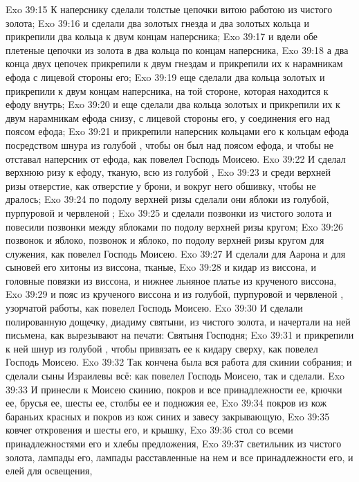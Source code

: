 \vs Exo 39:15 К наперснику сделали толстые цепочки витою работою из чистого золота;
\vs Exo 39:16 и сделали два золотых гнезда и два золотых кольца и прикрепили два кольца к двум концам наперсника;
\vs Exo 39:17 и вдели обе плетеные цепочки из золота в два кольца по концам наперсника,
\vs Exo 39:18 а два конца двух цепочек прикрепили к двум гнездам и прикрепили их к нарамникам ефода с лицевой стороны его;
\vs Exo 39:19 еще сделали два кольца золотых и прикрепили к двум  концам наперсника, на той стороне, которая находится к ефоду внутрь;
\vs Exo 39:20 и еще сделали два кольца золотых и прикрепили их к двум нарамникам ефода снизу, с лицевой стороны его, у соединения его над поясом ефода;
\vs Exo 39:21 и прикрепили наперсник кольцами его к кольцам ефода посредством шнура из голубой , чтобы он был над поясом ефода, и чтобы не отставал наперсник от ефода, как повелел Господь Моисею.
\rsbpar\vs Exo 39:22 И сделал верхнюю ризу к ефоду, тканую, всю из голубой ,
\vs Exo 39:23 и среди верхней ризы отверстие, как отверстие у брони, и вокруг него обшивку, чтобы не дралось;
\vs Exo 39:24 по подолу верхней ризы сделали они яблоки из голубой, пурпуровой и червленой ;
\vs Exo 39:25 и сделали позвонки из чистого золота и повесили позвонки между яблоками по подолу верхней ризы кругом;
\vs Exo 39:26 позвонок и яблоко, позвонок и яблоко, по подолу верхней ризы кругом для служения, как повелел Господь Моисею.
\rsbpar\vs Exo 39:27 И сделали для Аарона и для сыновей его хитоны из виссона, тканые,
\vs Exo 39:28 и кидар из виссона, и головные повязки из виссона, и нижнее льняное платье из крученого виссона,
\vs Exo 39:29 и пояс из крученого виссона и из голубой, пурпуровой и червленой , узорчатой работы, как повелел Господь Моисею.
\rsbpar\vs Exo 39:30 И сделали полированную дощечку, диадиму святыни, из чистого золота, и начертали на ней письмена, как вырезывают на печати: Святыня Господня;
\vs Exo 39:31 и прикрепили к ней шнур из голубой , чтобы привязать ее к кидару сверху, как повелел Господь Моисею.
\rsbpar\vs Exo 39:32 Так кончена была вся работа для скинии собрания; и сделали сыны Израилевы всё: как повелел Господь Моисею, так и сделали.
\vs Exo 39:33 И принесли к Моисею скинию, покров и все принадлежности ее, крючки ее, брусья ее, шесты ее, столбы ее и подножия ее,
\vs Exo 39:34 покров из кож бараньих красных и покров из кож синих и завесу закрывающую,
\vs Exo 39:35 ковчег откровения и шесты его, и крышку,
\vs Exo 39:36 стол со всеми принадлежностями его и хлебы предложения,
\vs Exo 39:37 светильник из чистого золота, лампады его, лампады расставленные на нем и все принадлежности его, и елей для освещения,
